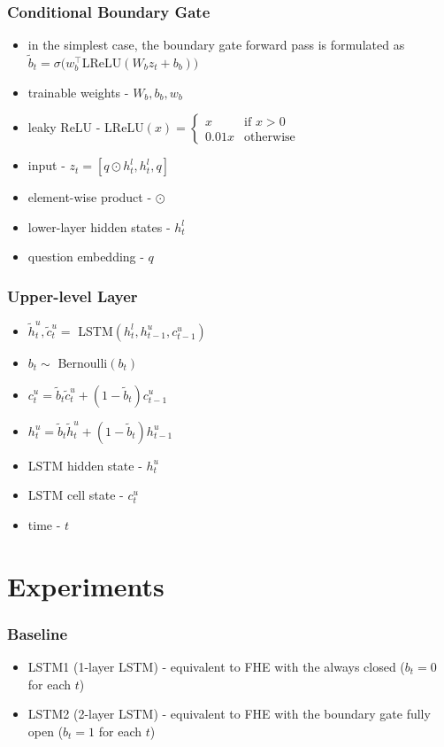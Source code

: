 \documentclass{beamer}
\begin{document}
\begin{frame}
    \frametitle{Conditional Boundary Gate}
    \begin{itemize}
        \item in the simplest case, the boundary gate forward pass is
formulated as $ \tilde{b}_t = \sigma(w_b^{\top}$LReLU$(W_b z_t + b_b)) $
        \item trainable weights - $ W_b, b_b, w_b $
        \item leaky ReLU - LReLU$(x) = \left\{
        \begin{array}{ll}
        x & \textrm{if } x>0 \\
        0.01x & \textrm{otherwise}
        \end{array} \right. $
        \item input - $ z_t = [q \odot h_t^l, h_t^l, q] $
        \item element-wise product - $ \odot $
        \item lower-layer hidden states - $ h_t^l $
        \item question embedding - $ q $
    \end{itemize}
\end{frame}

\begin{frame}
    \frametitle{Upper-level Layer}
    \begin{itemize}
        \item $ \tilde{h}_t^u, \tilde{c}_t^u = $ LSTM$(h_t^l, h_{t-1}^u, c_{t-1}^u) $
        \item $ b_t \sim $ Bernoulli$(b_t)$
        \item $ c_t^u = \tilde{b}_{t}\tilde{c}_t^u + (1 - \tilde{b}_{t})c_{t-1}^u $
        \item $ h_t^u = \tilde{b}_{t}\tilde{h}_t^u + (1 - \tilde{b}_{t})h_{t-1}^u $
        \item LSTM hidden state - $ h_t^u $
        \item LSTM cell state - $ c_t^u $
        \item time - $ t $
    \end{itemize}
\end{frame}


\section{Experiments}

\begin{frame}
    \frametitle{Baseline}
    \begin{itemize}
        \item LSTM1 (1-layer LSTM) - equivalent to FHE with the always closed ($b_t = 0$ for each $t$)
        \item LSTM2 (2-layer LSTM) - equivalent to FHE with the boundary gate fully open ($b_t = 1$ for each $t$)
    \end{itemize}
\end{frame}
\end{document}
